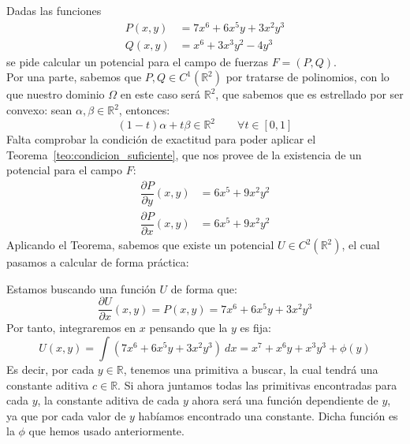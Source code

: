 \begin{ejemplo}
    Dadas las funciones
    \begin{align*}
        P(x,y) &= 7x^6+6x^5y+3x^2y^3  \\
        Q(x,y) &= x^6+3x^3y^2 -4y^3
    \end{align*}
    se pide calcular un potencial para el campo de fuerzas $F=(P,Q)$.\\

    Por una parte, sabemos que $P,Q\in C^1(\mathbb{R}^2)$ por tratarse de polinomios, con lo que nuestro dominio $\Omega$ en este caso será $\mathbb{R}^2$, que sabemos que es estrellado por ser convexo: sean $\alpha,\beta\in \mathbb{R}^2$, entonces:
    \begin{equation*}
        (1-t)\alpha + t\beta \in \mathbb{R}^2 \qquad \forall t\in [0,1]
    \end{equation*}
    Falta comprobar la condición de exactitud para poder aplicar el Teorema~\ref{teo:condicion_suficiente}, que nos provee de la existencia de un potencial para el campo $F$:
    \begin{align*}
        \dfrac{\partial P}{\partial y}(x,y) &= 6x^5+9x^2y^2 \\
        \dfrac{\partial P}{\partial x}(x,y) &= 6x^5+9x^2y^2
    \end{align*}
    Aplicando el Teorema, sabemos que existe un potencial $U\in C^2(\mathbb{R}^2)$, el cual pasamos a calcular de forma práctica:

    Estamos buscando una función $U$ de forma que:
    \begin{equation*}
        \dfrac{\partial U}{\partial x}(x,y) = P(x,y) = 7x^6+6x^5y+3x^2y^3
    \end{equation*}
    Por tanto, integraremos en $x$ pensando que la $y$ es fija:
    \begin{equation*}
        U(x,y) = \int (7x^6+6x^5y+3x^2y^3)~dx = x^7+x^6y+x^3y^3 + \phi(y)
    \end{equation*}
    Es decir, por cada $y\in \mathbb{R}$, tenemos una primitiva a buscar, la cual tendrá una constante aditiva $c\in \mathbb{R}$. Si ahora juntamos todas las primitivas encontradas para cada $y$, la constante aditiva de cada $y$ ahora será una función dependiente de $y$, ya que por cada valor de $y$ habíamos encontrado una constante. Dicha función es la $\phi$ que hemos usado anteriormente. 


\end{ejemplo}
